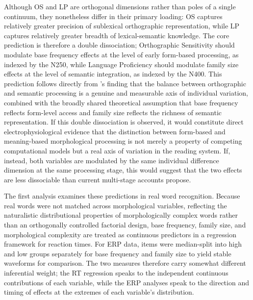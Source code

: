 Although OS and LP are orthogonal dimensions rather than poles of a single continuum, they nonetheless differ in their primary loading: OS captures relatively greater precision of sublexical orthographic representation, while LP captures relatively greater breadth of lexical-semantic knowledge. The core prediction is therefore a double dissociation; Orthographic Sensitivity should modulate base frequency effects at the level of early form-based processing, as indexed by the N250, while Language Proficiency should modulate family size effects at the level of semantic integration, as indexed by the N400. This prediction follows directly from \citeauthor{andrewsMorphologicalPrimingStronger2013}'s \citeyearpar{andrewsMorphologicalPrimingStronger2013} finding that the balance between orthographic and semantic processing is a genuine and measurable axis of individual variation, combined with the broadly shared theoretical assumption that base frequency reflects form-level access and family size reflects the richness of semantic representation. If this double dissociation is observed, it would constitute direct electrophysiological evidence that the distinction between form-based and meaning-based morphological processing is not merely a property of competing computational models but a real axis of variation in the reading system. If, instead, both variables are modulated by the same individual difference dimension at the same processing stage, this would suggest that the two effects are less dissociable than current multi-stage accounts propose.
	
	The first analysis examines these predictions in real word recognition. Because real words were not matched across morphological variables, reflecting the naturalistic distributional properties of morphologically complex words rather than an orthogonally controlled factorial design, base frequency, family size, and morphological complexity are treated as continuous predictors in a regression framework for reaction times. For ERP data, items were median-split into high and low groups separately for base frequency and family size to yield stable waveforms for comparison. The two measures therefore carry somewhat different inferential weight; the RT regression speaks to the independent continuous contributions of each variable, while the ERP analyses speak to the direction and timing of effects at the extremes of each variable's distribution.
	
